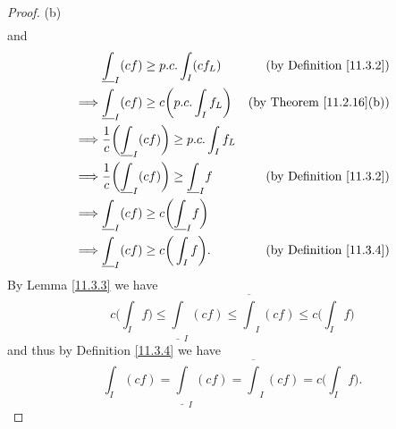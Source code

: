 \begin{proof}{(b)}
\begin{align*}
    \end{align*}
    and
    \begin{align*}
                 & \underline{\int}_I (cf) \geq p.c. \int_I (c f_L)                          & \text{(by Definition \ref{11.3.2})}  \\
        \implies & \underline{\int}_I (cf) \geq c \bigg(p.c. \int_I f_L\bigg)                & \text{(by Theorem \ref{11.2.16}(b))} \\
        \implies & \frac{1}{c} \bigg(\underline{\int}_I (cf)\bigg) \geq p.c. \int_I f_L                                             \\
        \implies & \frac{1}{c} \bigg(\underline{\int}_I (cf)\bigg) \geq \underline{\int}_I f & \text{(by Definition \ref{11.3.2})}  \\
        \implies & \underline{\int}_I (cf) \geq c\bigg(\underline{\int}_I f\bigg)                                                   \\
        \implies & \underline{\int}_I (cf) \geq c\bigg(\int_I f\bigg).                       & \text{(by Definition \ref{11.3.4})}
    \end{align*}
    By Lemma \ref{11.3.3} we have
    \[
        c\bigg(\int_I f\bigg) \leq \underline{\int}_I (cf) \leq \overline{\int}_I (cf) \leq c\bigg(\int_I f\bigg)
    \]
    and thus by Definition \ref{11.3.4} we have
    \[
        \int_I (cf) = \underline{\int}_I (cf) = \overline{\int}_I (cf) = c\bigg(\int_I f\bigg).
    \]


\end{proof}
